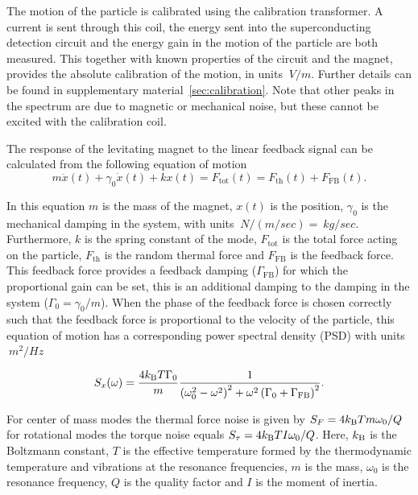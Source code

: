 The motion of the particle is calibrated using the calibration transformer. A current is sent through this coil, the energy sent into the superconducting detection circuit and the energy gain in the motion of the particle are both measured. This together with known properties of the circuit and the magnet, provides the absolute calibration of the motion, in units $\SI{}{V/m}$. Further details can be found in supplementary material~\ref{sec:calibration}. Note that other peaks in the spectrum are due to magnetic or mechanical noise, but these cannot be excited with the calibration coil.

The response of the levitating magnet to the linear feedback signal can be calculated from the following equation of motion
\begin{equation}
    m \ddot{x}(t) + \gamma_\text{0} \dot{x}(t) + kx(t) = F_\text{tot}(t) = F_\text{th}(t) + F_\text{FB}(t).
\end{equation}

In this equation $m$ is the mass of the magnet, $x(t)$ is the position, $\gamma_0$ is the mechanical damping in the system, with units $\SI{}{N/(m/sec)} = \SI{}{kg/sec}$. Furthermore, $k$ is the spring constant of the mode, $F_\text{tot}$ is the total force acting on the particle, $F_\text{th}$ is the random thermal force and $F_\text{FB}$ is the feedback force. This feedback force provides a feedback damping ($\Gamma_\text{FB}$) for which the proportional gain can be set, this is an additional damping to the damping in the system ($\Gamma_\text{0}=\gamma_0/m$). When the phase of the feedback force is chosen correctly such that the feedback force is proportional to the velocity of the particle, this equation of motion has a corresponding power spectral density (PSD) with units $\SI{}{m^2/Hz}$

\begin{equation}
    S_{x}(\omega) = \frac{4 k_\text{B} T \Gamma_\text{0}}{m} \frac{1}{\left( \omega_0^2 - \omega^2 \right)^2 + \omega^2 \left(\Gamma_\text{0} + \Gamma_\text{FB} \right)^2}.
\end{equation}

For center of mass modes the thermal force noise is given by $S_F = 4 k_\text{B} T m \omega_0 / Q$ for rotational modes the torque noise equals $S_\tau = 4 k_\text{B} T I \omega_0 / Q$. Here, $k_\text{B}$ is the Boltzmann constant, $T$ is the effective temperature formed by the thermodynamic temperature and vibrations at the resonance frequencies, $m$ is the mass, $\omega_0$ is the resonance frequency, $Q$ is the quality factor and $I$ is the moment of inertia. 


